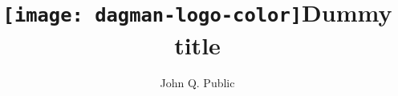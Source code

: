 \documentclass[a4paper,USenglish]{dagman-master-v2021}
\title{\texttt{[image: dagman-logo-color]}}
\begin{document}
\maketitle


\begin{contentslist}

\contitem
\title{Dummy title}
\author{John Q. Public}

\end{contentslist}

\bigskip

\vfill


\bottomline



\end{document}

